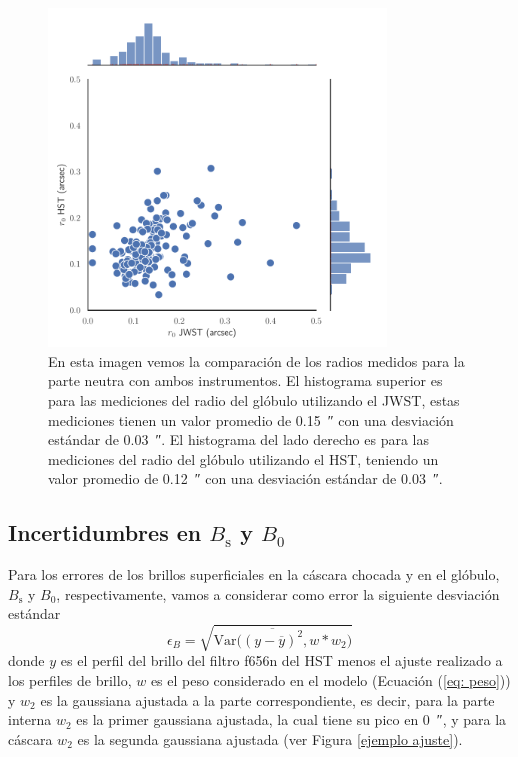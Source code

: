 \documentclass{book}
\begin{document}
\begin{figure}[htb]
    \centering
    \includegraphics[width=0.8\textwidth]{imagenes_corregidas/r_0.pdf}
    \caption{En esta imagen vemos la comparación de los radios medidos para la parte neutra con ambos instrumentos. El histograma superior es para las mediciones del radio del glóbulo utilizando el JWST, estas mediciones tienen un valor promedio de \SI{0.15}{\arcsecond} con una desviación estándar de \SI{0.03}{\arcsecond}. El histograma del lado derecho es para las mediciones del radio del glóbulo utilizando el HST, teniendo un valor promedio de \SI{0.12}{\arcsecond} con una desviación estándar de \SI{0.03}{\arcsecond}. }
    \label{fig:Rcore dis}
\end{figure}

\subsection{\boldmath Incertidumbres en $B_\mathrm{s}$ y $B_0$}

Para los errores de los brillos superficiales en la cáscara chocada y en el glóbulo, $B_\mathrm{s}$ y $B_0$, respectivamente, vamos a considerar como error la siguiente desviación estándar
\begin{equation} \epsilon_{B}=\sqrt{\mathrm{Var}\Big(\overline{(y-\overline{y})^2},w*w_2\Big)} 
\end{equation} 
donde $y$ es el perfil del brillo del filtro f656n del HST menos el ajuste realizado a los perfiles de brillo, $w$ es el peso considerado en el modelo (Ecuación (\ref{eq: peso})) y $w_2$ es la gaussiana ajustada a la parte correspondiente, es decir, para la parte interna $w_2$ es la primer gaussiana ajustada, la cual tiene su pico en \SI{0}{\arcsecond}, y para la cáscara $w_2$ es la segunda gaussiana ajustada (ver Figura \ref{ejemplo ajuste}).\\
\end{document}
